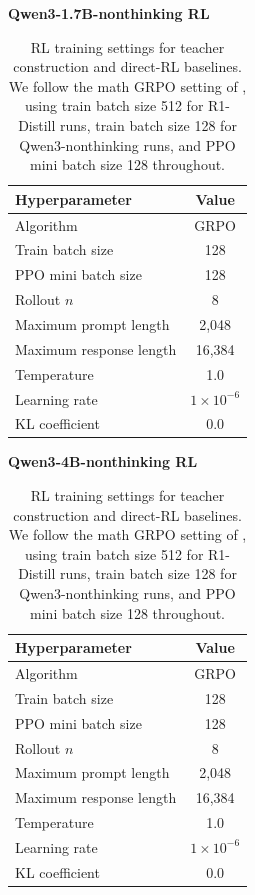 \begin{table}[H]
\vspace{0.8em}

\begin{minipage}[t]{0.48\linewidth}
\centering
\textbf{Qwen3-1.7B-nonthinking RL}\\[3pt]
\begin{tabular}{lc}
\toprule
Hyperparameter & Value \\
\midrule
Algorithm & GRPO \\
Train batch size & 128 \\
PPO mini batch size & 128 \\
Rollout $n$ & 8 \\
Maximum prompt length & 2,048 \\
Maximum response length & 16,384 \\
Temperature & 1.0 \\
Learning rate & $1\times10^{-6}$ \\
KL coefficient & 0.0 \\
\bottomrule
\end{tabular}
\end{minipage}\hfill
\begin{minipage}[t]{0.48\linewidth}
\centering
\textbf{Qwen3-4B-nonthinking RL}\\[3pt]
\begin{tabular}{lc}
\toprule
Hyperparameter & Value \\
\midrule
Algorithm & GRPO \\
Train batch size & 128 \\
PPO mini batch size & 128 \\
Rollout $n$ & 8 \\
Maximum prompt length & 2,048 \\
Maximum response length & 16,384 \\
Temperature & 1.0 \\
Learning rate & $1\times10^{-6}$ \\
KL coefficient & 0.0 \\
\bottomrule
\end{tabular}
\end{minipage}
\caption{RL training settings for teacher construction and direct-RL
baselines. We follow the math GRPO setting of \citet{gopd}, using train batch
size 512 for R1-Distill runs, train batch size 128 for Qwen3-nonthinking runs,
and PPO mini batch size 128 throughout.}
\label{tab:rl-training-settings}
\end{table}

